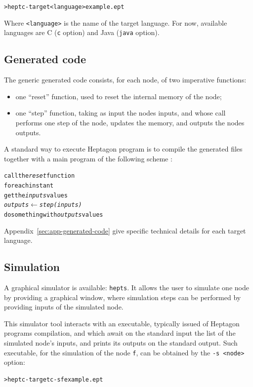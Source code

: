 \documentclass[a4paper]{article}
\begin{document}
\begin{alltt}
> heptc -target <language> example.ept
\end{alltt}

Where \texttt{<language>} is the name of the target language. For now, available
languages are C (\texttt{c} option) and Java (\texttt{java} option).

\subsection{Generated code}
\label{sec:generated-code}

The generic generated code consists, for each node, of two imperative functions:
\begin{itemize}
\item one ``reset'' function, used to reset the internal memory of the node;
\item one ``step'' function, taking as input the nodes inputs, and whose call
  performs one step of the node, updates the memory, and outputs the nodes
  outputs.
\end{itemize}

A standard way to execute Heptagon program is to compile the generated files
together with a main program of the following scheme :

\begin{alltt}
call the \textit{reset} function
for each instant
   get the \textit{inputs} values
   \textit{outputs} \(\leftarrow\) \textit{step(inputs)}
   do something with \textit{outputs} values
\end{alltt}

Appendix~\ref{sec:app-generated-code} give specific technical details for each target language.


\subsection{Simulation}
\label{sec:simulation}

A graphical simulator is available: \texttt{hepts}. It allows the user to simulate
one node by providing a graphical window, where simulation steps can be
performed by providing inputs of the simulated node.

This simulator tool interacts with an executable, typically issued of Heptagon
programs compilation, and which await on the standard input the list of the
simulated node's inputs, and prints its outputs on the standard output. Such
executable, for the simulation of the node \texttt{f}, can be obtained by the
\texttt{-s <node>} option:
\begin{alltt}
> heptc -target c -s f example.ept
\end{alltt}
\end{document}
